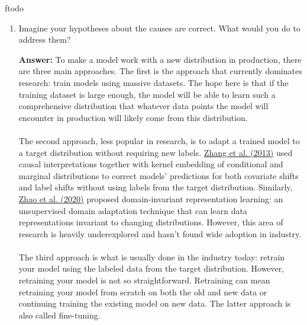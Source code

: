 ƒtodo\documentclass{article}
\newenvironment{QandA}{\begin{enumerate}[label=\arabic*.]}{\end{enumerate}}
\newenvironment{InnerQandA}{\begin{enumerate}[label=\roman*.]}{\end{enumerate}}
\newenvironment{answer}{\par\normalfont \textbf{Answer:}}{}
\begin{document}
\begin{QandA}
\begin{InnerQandA}
\begin{answer}
            When dealing with temporal shifts, the time scale window of the data we look at affects the shifts we can detect. If your data has a weekly cycle, then a time scale of less than a week won’t detect the cycle. Therefore, by setting the time window too small, your detection technique can produce a false alarm simply due to the seasonality inherent to the data. \\\\
            When computing running statistics over time, it’s important to differentiate between cumulative and sliding statistics. Sliding statistics are computed within a single time scale window, e.g. an hour. Cumulative statistics are continually updated with more data. This means for each beginning of a time scale window, the sliding accuracy is reset, whereas the cumulative sliding accuracy is not. Because cumulative statistics contain information from previous time windows, they might obscure what happens in a specific time window. 
        \end{answer}

        \item Imagine your hypotheses about the causes are correct. What would you do to address them?
        \begin{answer}
            To make a model work with a new distribution in production, there are three main approaches. The first is the approach that currently dominates research: train models using massive datasets. The hope here is that if the training dataset is large enough, the model will be able to learn such a comprehensive distribution that whatever data points the model will encounter in production will likely come from this distribution. \\\\
            The second approach, less popular in research, is to adapt a trained model to a target distribution without requiring new labels. \href{http://proceedings.mlr.press/v28/zhang13d.pdf}{Zhang et al. (2013)} used causal interpretations together with kernel embedding of conditional and marginal distributions to correct models’ predictions for both covariate shifts and label shifts without using labels from the target distribution. Similarly, \href{http://proceedings.mlr.press/v97/zhao19a.html}{Zhao et al. (2020)} proposed domain-invariant representation learning: an unsupervised domain adaptation technique that can learn data representations invariant to changing distributions. However, this area of research is heavily underexplored and hasn’t found wide adoption in industry. \\\\
            The third approach is what is usually done in the industry today: retrain your model using the labeled data from the target distribution. However, retraining your model is not so straightforward. Retraining can mean retraining your model from scratch on both the old and new data or continuing training the existing model on new data. The latter approach is also called fine-tuning.
        \end{answer}


\end{InnerQandA}
\end{QandA}
\end{document}
